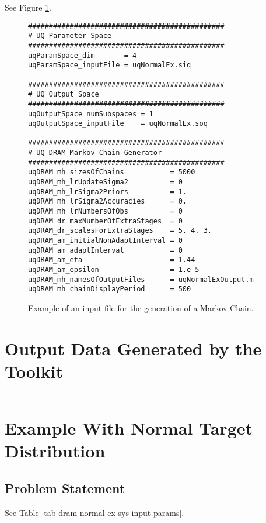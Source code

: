 See Figure \ref{fig-dram-input-file-ex}.

\begin{figure}[h!]
\begin{verbatim}
###############################################
# UQ Parameter Space
###############################################
uqParamSpace_dim       = 4
uqParamSpace_inputFile = uqNormalEx.siq

###############################################
# UQ Output Space
###############################################
uqOutputSpace_numSubspaces = 1
uqOutputSpace_inputFile    = uqNormalEx.soq

###############################################
# UQ DRAM Markov Chain Generator
###############################################
uqDRAM_mh_sizesOfChains           = 5000
uqDRAM_mh_lrUpdateSigma2          = 0
uqDRAM_mh_lrSigma2Priors          = 1.
uqDRAM_mh_lrSigma2Accuracies      = 0.
uqDRAM_mh_lrNumbersOfObs          = 0
uqDRAM_dr_maxNumberOfExtraStages  = 0
uqDRAM_dr_scalesForExtraStages    = 5. 4. 3.
uqDRAM_am_initialNonAdaptInterval = 0
uqDRAM_am_adaptInterval           = 0
uqDRAM_am_eta                     = 1.44
uqDRAM_am_epsilon                 = 1.e-5
uqDRAM_mh_namesOfOutputFiles      = uqNormalExOutput.m
uqDRAM_mh_chainDisplayPeriod      = 500
\end{verbatim}
\caption{Example of an input file for the generation of a Markov Chain.
}
\label{fig-dram-input-file-ex}
\end{figure}

\section{Output Data Generated by the Toolkit}\label{sc-gmc-dram-output}
$~$\\

\clearpage

\section{Example With Normal Target Distribution}\label{sc-gmc-dram-normal-ex}

\subsection{Problem Statement}

See Table \ref{tab-dram-normal-ex-sys-input-params}.

